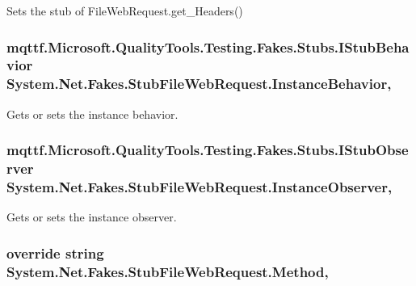 Sets the stub of File\-Web\-Request.\-get\-\_\-\-Headers()

\hypertarget{class_system_1_1_net_1_1_fakes_1_1_stub_file_web_request_a152042b8ca827a39180a0a6ed86abf6e}{
\subsubsection[{Instance\-Behavior}]{\setlength{\rightskip}{0pt plus 5cm}mqttf.\-Microsoft.\-Quality\-Tools.\-Testing.\-Fakes.\-Stubs.\-I\-Stub\-Behavior System.\-Net.\-Fakes.\-Stub\-File\-Web\-Request.\-Instance\-Behavior\hspace{0.3cm}{\ttfamily [get]}, {\ttfamily [set]}}}\label{class_system_1_1_net_1_1_fakes_1_1_stub_file_web_request_a152042b8ca827a39180a0a6ed86abf6e}


Gets or sets the instance behavior.

\hypertarget{class_system_1_1_net_1_1_fakes_1_1_stub_file_web_request_a2da4910218db26e36161bd9980a5334d}{
\subsubsection[{Instance\-Observer}]{\setlength{\rightskip}{0pt plus 5cm}mqttf.\-Microsoft.\-Quality\-Tools.\-Testing.\-Fakes.\-Stubs.\-I\-Stub\-Observer System.\-Net.\-Fakes.\-Stub\-File\-Web\-Request.\-Instance\-Observer\hspace{0.3cm}{\ttfamily [get]}, {\ttfamily [set]}}}\label{class_system_1_1_net_1_1_fakes_1_1_stub_file_web_request_a2da4910218db26e36161bd9980a5334d}


Gets or sets the instance observer.

\hypertarget{class_system_1_1_net_1_1_fakes_1_1_stub_file_web_request_a955364fd0342111c27ee135baba3773c}{
\subsubsection[{Method}]{\setlength{\rightskip}{0pt plus 5cm}override string System.\-Net.\-Fakes.\-Stub\-File\-Web\-Request.\-Method\hspace{0.3cm}{\ttfamily [get]}, {\ttfamily [set]}}}\label{class_system_1_1_net_1_1_fakes_1_1_stub_file_web_request_a955364fd0342111c27ee135baba3773c}



